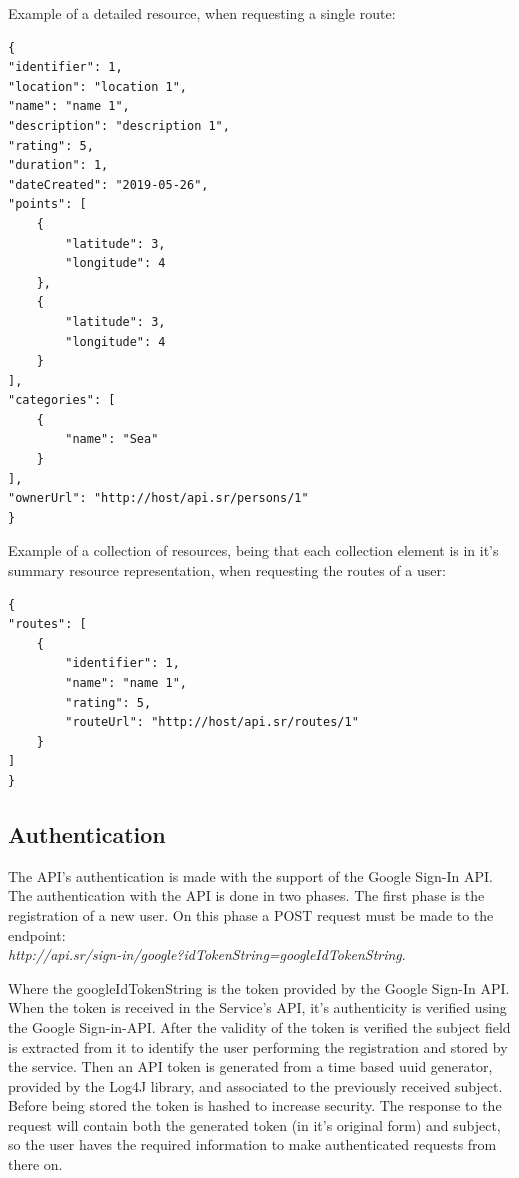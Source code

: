         Example of a detailed resource, when requesting a single route:

        \begin{lstlisting}
{
"identifier": 1,
"location": "location 1",
"name": "name 1",
"description": "description 1",
"rating": 5,
"duration": 1,
"dateCreated": "2019-05-26",
"points": [
    {
        "latitude": 3,
        "longitude": 4
    },
    {
        "latitude": 3,
        "longitude": 4
    }
],
"categories": [
    {
        "name": "Sea"
    }
],
"ownerUrl": "http://host/api.sr/persons/1"
}
        \end{lstlisting}

        Example of a collection of resources, being that each collection element is in it's summary resource representation, when
        requesting the routes of a user:
        
        \begin{lstlisting}
{
"routes": [
    {
        "identifier": 1,
        "name": "name 1",
        "rating": 5,
        "routeUrl": "http://host/api.sr/routes/1"
    }
]
}
        \end{lstlisting}
    
    \newpage
    
    \subsection*{Authentication}
    The API's authentication is made with the support of the Google Sign-In API. The authentication with the API is done in two phases.
    The first phase is the registration of a new user. On this phase a POST request must be made to the endpoint:\\ 
    \textit{http://api.sr/sign-in/google?idTokenString=googleIdTokenString}.\par
    Where the googleIdTokenString is the token provided by the Google Sign-In API. When the token is received in the Service's API, it's authenticity is verified using the Google Sign-in-API. 
    After the validity of the token is verified the subject field is extracted from it to identify the user performing the registration and stored by the service. 
    Then an API token is generated from a time based uuid generator, provided by the Log4J library, and associated to the previously received subject. 
    Before being stored the token is hashed to increase security. The response to the request will contain both the generated token (in it's original form) 
    and subject, so the user haves the required information to make authenticated requests from there on.\par

